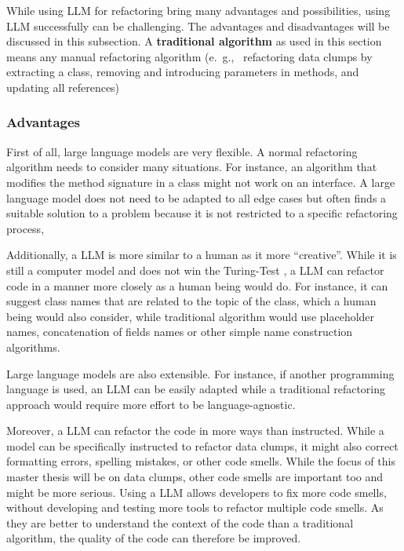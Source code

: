 While using  \ac{LLM} for refactoring bring many advantages  and possibilities, using \ac{LLM}  successfully can be challenging. The advantages and disadvantages will be discussed in this subsection. A \textbf{traditional algorithm} as used in this section means any manual refactoring algorithm (e.~g.,~ refactoring data clumps by extracting a class, removing and introducing parameters in methods, and updating all references)

\subsubsection{Advantages}

First of all, large language models are very flexible. A normal refactoring algorithm needs to consider many situations. For instance, an algorithm that modifies the method signature in a class might not work on an interface. A large language model does not need to be adapted to all edge cases but often finds a suitable solution to a problem because it is not restricted to a specific refactoring process, 

Additionally, a \ac{LLM} is more similar to a human as it more  \enquote{creative}. While it is still a computer model and does not win the Turing-Test \cite{turing_test}, a \ac{LLM} can refactor code in a manner more closely as a human being would do. For instance, it can suggest class names that are related to the topic of the class, which a human being would also consider, while traditional algorithm would use placeholder names, concatenation of fields names or other simple name construction algorithms. 

Large language models are also extensible. For instance, if another programming language is used, an \ac{LLM} can be easily adapted while a traditional refactoring approach would require more effort to be language-agnostic.

Moreover, a \ac{LLM} can refactor the code in more ways than instructed. While  a model can be  specifically instructed to refactor data clumps, it might also correct formatting errors, spelling mistakes, or other code smells. While the focus of this master thesis will be on data clumps, other code smells are important too and might be more serious. Using a  \ac{LLM} allows developers to fix more code smells, without developing and testing more tools to refactor multiple code smells. As they are better to understand the context of the code than a traditional algorithm, the quality of the code can therefore be improved. 

